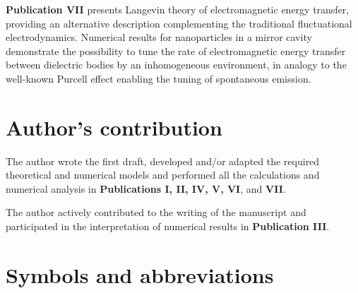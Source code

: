 \documentclass[dissertation]{aaltoseries}
\newcommand{\listofsymbols}{%
  \chapter*{Symbols and abbreviations}%
}
\begin{document}
\vspace{1cm}
\noindent
\textbf{Publication VII} presents Langevin theory of electromagnetic energy transfer, providing an alternative description complementing the traditional fluctuational electrodynamics. Numerical results for nanoparticles in a mirror cavity demonstrate the possibility to tune the rate of electromagnetic energy transfer between dielectric bodies by an inhomogeneous environment, in analogy to the well-known Purcell effect enabling the tuning of spontaneous emission.

\chapter*{Author's contribution}
The author wrote the first draft, developed and/or adapted the required theoretical and numerical models and performed all the calculations and numerical analysis in \textbf{Publications I, II, IV, V, VI}, and \textbf{VII}.

\vspace{1cm}
\noindent
The author actively contributed to the writing of the manuscript and participated in the interpretation of numerical results in \textbf{Publication III}.

\listofsymbols
{}
\end{document}
